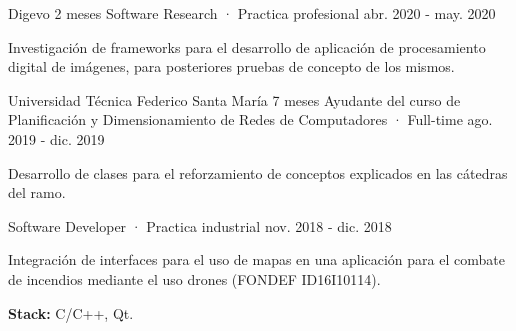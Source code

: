 

\begin{cventries}
  \cventry
    {Digevo} %
    {2 meses} %
    {Software Research · Practica profesional} %
    {abr. 2020 - may. 2020} %
    {
      \begin{cvitems} %
        \item {Investigación de frameworks para el desarrollo de aplicación de procesamiento digital de imágenes, para posteriores pruebas de concepto de los mismos.}
      \end{cvitems}
    }

  \cvmultientry
    {Universidad Técnica Federico Santa María} %
    {7 meses}
    {Ayudante del curso de Planificación y Dimensionamiento de Redes de Computadores · Full-time} %
    {ago. 2019 - dic. 2019} %
    {
      \begin{cvitems} %
          \item {Desarrollo de clases para el reforzamiento de conceptos explicados en las cátedras del ramo.}
      \end{cvitems}
    }
    {Software Developer · Practica industrial} %
    {nov. 2018 - dic. 2018} %
    {
      \begin{cvitems} %
        \item {Integración de interfaces para el uso de mapas en una aplicación para el combate de incendios mediante el uso drones (FONDEF ID16I10114).}
        \item {\textbf{Stack:} C/C++, Qt.}
      \end{cvitems}
    }
    {}

\end{cventries}
